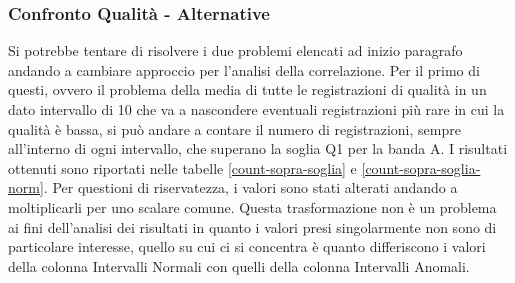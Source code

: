 \begin{table}[H]
	\begin{minipage}{.5\textwidth}
		\centering
		\label{mvm-confusion1}
	\end{minipage}
	\begin{minipage}{.5\textwidth}
		\centering
		\label{mvm-confusion2}
	\end{minipage}
\end{table}


\subsubsection{Confronto Qualità - Alternative}
Si potrebbe tentare di risolvere i due problemi elencati ad inizio paragrafo andando a cambiare approccio per l'analisi della correlazione.
Per il primo di questi, ovvero il problema della media di tutte le registrazioni di qualità in un dato intervallo di 10 che va a nascondere eventuali registrazioni più rare in cui la qualità è bassa, si può andare a contare il numero di registrazioni, sempre all'interno di ogni intervallo, che superano la soglia Q1 per la banda A.
I risultati ottenuti sono riportati nelle tabelle \ref{count-sopra-soglia} e \ref{count-sopra-soglia-norm}. Per questioni di riservatezza, i valori sono stati alterati andando a moltiplicarli per uno scalare comune. 
Questa trasformazione non è un problema ai fini dell'analisi dei risultati in quanto i valori presi singolarmente non sono di particolare interesse, quello su cui ci si concentra è quanto differiscono i valori della colonna Intervalli Normali con quelli della colonna Intervalli Anomali.



